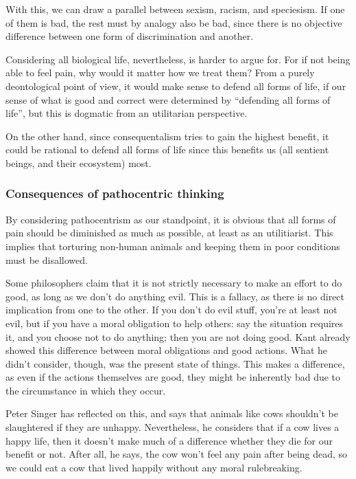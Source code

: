 \documentclass{myassignment}
\newcommand{\q}[1]{``#1''}
\begin{document}
\begin{answer}
		With this, we can draw a parallel between sexism, racism, and speciesism. If one of them is bad, the rest must by analogy also be bad, since there is no objective difference between one form of discrimination and another.

		Considering all biological life, nevertheless, is harder to argue for. For if not being able to feel pain, why would it matter how we treat them? From a purely deontological point of view, it would make sense to defend all forms of life, if our sense of what is good and correct were determined by \q{defending all forms of life}, but this is dogmatic from an utilitarian perspective. 

		On the other hand, since consequentalism tries to gain the highest benefit, it could be rational to defend all forms of life since this benefits us (all sentient beings, and their ecosystem) most.


		\subsubsection*{Consequences of pathocentric thinking}%

		By considering pathocentrism as our standpoint, it is obvious that all forms of pain should be diminished as much as possible, at least as an utilitiarist. This implies that torturing non-human animals and keeping them in poor conditions must be disallowed. 

		Some philosophers claim that it is not strictly necessary to make an effort to do good, as long as we don't do anything evil. This is a fallacy, as there is no direct implication from one to the other. If you don't do evil stuff, you're at least not evil, but if you have a moral obligation to help others: say the situation requires it, and you choose not to do anything; then you are not doing good. Kant already showed this difference between moral obligations and good actions. What he didn't consider, though, was the present state of things. This makes a difference, as even if the actions themselves are good, they might be inherently bad due to the circumstance in which they occur.

		Peter Singer has reflected on this, and says that animals like cows shouldn't be slaughtered if they are unhappy. Nevertheless, he considers that if a cow lives a happy life, then it doesn't make much of a difference whether they die for our benefit or not. After all, he says, the cow won't feel any pain after being dead, so we could eat a cow that lived happily without any moral rulebreaking.


\end{answer}
\end{document}

